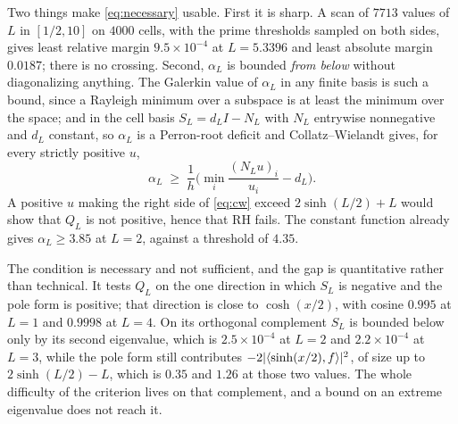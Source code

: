 \begin{remark}
\label{rem:necessary}
Two things make \eqref{eq:necessary} usable. First it is sharp. A scan of
$7713$ values of $L$ in $[1/2,10]$ on $4000$ cells, with the prime thresholds
sampled on both sides, gives least relative margin $9.5\times10^{-4}$ at
$L=5.3396$ and least absolute margin $0.0187$; there is no crossing. Second,
$\alpha_L$ is bounded \emph{from below} without diagonalizing anything. The
Galerkin value of $\alpha_L$ in any finite basis is such a bound, since a
Rayleigh minimum over a subspace is at least the minimum over the space; and in
the cell basis $S_L=d_LI-N_L$ with $N_L$ entrywise nonnegative and $d_L$
constant, so $\alpha_L$ is a Perron-root deficit and Collatz--Wielandt gives,
for every strictly positive $u$,
\begin{equation}\label{eq:cw}
 \alpha_L\;\geq\;\frac1h\Big(\min_i\frac{(N_Lu)_i}{u_i}-d_L\Big).
\end{equation}
A positive $u$ making the right side of \eqref{eq:cw} exceed $2\sinh(L/2)+L$
would show that $Q_L$ is not positive, hence that RH fails. The constant
function already gives $\alpha_L\geq3.85$ at $L=2$, against a threshold of
$4.35$.

The condition is necessary and not sufficient, and the gap is quantitative
rather than technical. It tests $Q_L$ on the one direction in which $S_L$ is
negative and the pole form is positive; that direction is close to
$\cosh(x/2)$, with cosine $0.995$ at $L=1$ and $0.9998$ at $L=4$. On its
orthogonal complement $S_L$ is bounded below only by its second eigenvalue,
which is $2.5\times10^{-4}$ at $L=2$ and $2.2\times10^{-4}$ at $L=3$, while the
pole form still contributes $-2|\langle \sinh(x/2),f\rangle|^2$, of size up to
$2\sinh(L/2)-L$, which is $0.35$ and $1.26$ at those two values. The whole
difficulty of the criterion lives on that complement, and a bound on an extreme
eigenvalue does not reach it.
\end{remark}
